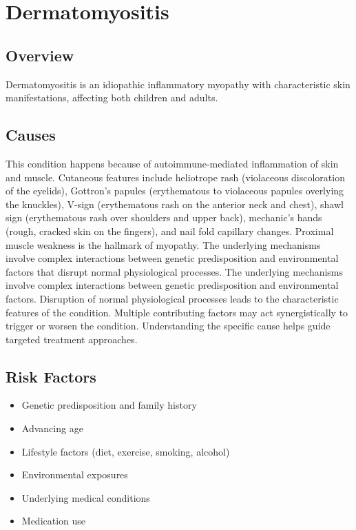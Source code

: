 \chapter{Dermatomyositis}
\label{sec:skin:Dermatomyositis}

\section{Overview}
Dermatomyositis is an idiopathic inflammatory myopathy with characteristic skin manifestations, affecting both children and adults.
\section{Causes}
This condition happens because of autoimmune-mediated inflammation of skin and muscle. Cutaneous features include heliotrope rash (violaceous discoloration of the eyelids), Gottron's papules (erythematous to violaceous papules overlying the knuckles), V-sign (erythematous rash on the anterior neck and chest), shawl sign (erythematous rash over shoulders and upper back), mechanic's hands (rough, cracked skin on the fingers), and nail fold capillary changes. Proximal muscle weakness is the hallmark of myopathy. The underlying mechanisms involve complex interactions between genetic predisposition and environmental factors that disrupt normal physiological processes. The underlying mechanisms involve complex interactions between genetic predisposition and environmental factors. Disruption of normal physiological processes leads to the characteristic features of the condition. Multiple contributing factors may act synergistically to trigger or worsen the condition. Understanding the specific cause helps guide targeted treatment approaches.
\section{Risk Factors}


\begin{itemize}[noitemsep]
  \item Genetic predisposition and family history
  \item Advancing age
  \item Lifestyle factors (diet, exercise, smoking, alcohol)
  \item Environmental exposures
  \item Underlying medical conditions
  \item Medication use
\end{itemize}
